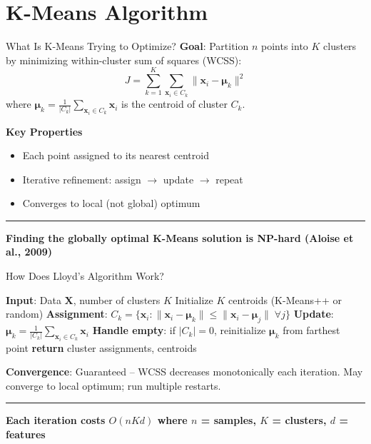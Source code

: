 \documentclass[8pt,aspectratio=169]{beamer}
\newcommand{\bottomnote}[1]{%
\vfill
\vspace{-2mm}
\textcolor{mllavender2}{\rule{\textwidth}{0.4pt}}
\vspace{1mm}
\footnotesize
\textbf{#1}
}
\begin{document}
\section{K-Means Algorithm}

\begin{frame}[t]{What Is K-Means Trying to Optimize?}
\textbf{Goal}: Partition $n$ points into $K$ clusters by minimizing within-cluster sum of squares (WCSS):
$$J = \sum_{k=1}^{K}\sum_{\mathbf{x}_i \in C_k}\|\mathbf{x}_i - \boldsymbol{\mu}_k\|^2$$
where $\boldsymbol{\mu}_k = \frac{1}{|C_k|}\sum_{\mathbf{x}_i \in C_k} \mathbf{x}_i$ is the centroid of cluster $C_k$.
\vspace{0.5em}

\textbf{Key Properties}
\begin{itemize}
\item Each point assigned to its nearest centroid
\item Iterative refinement: assign $\to$ update $\to$ repeat
\item Converges to local (not global) optimum
\end{itemize}
\bottomnote{Finding the globally optimal K-Means solution is NP-hard (Aloise et al., 2009)}
\end{frame}

\begin{frame}[t]{How Does Lloyd's Algorithm Work?}
\begin{algorithmic}[1]
\STATE \textbf{Input}: Data $\mathbf{X}$, number of clusters $K$
\STATE Initialize $K$ centroids (K-Means++ or random)
\REPEAT
\STATE \textbf{Assignment}: $C_k = \{\mathbf{x}_i : \|\mathbf{x}_i - \boldsymbol{\mu}_k\| \leq \|\mathbf{x}_i - \boldsymbol{\mu}_j\| \; \forall j\}$
\STATE \textbf{Update}: $\boldsymbol{\mu}_k = \frac{1}{|C_k|}\sum_{\mathbf{x}_i \in C_k} \mathbf{x}_i$
\STATE \textbf{Handle empty}: if $|C_k| = 0$, reinitialize $\boldsymbol{\mu}_k$ from farthest point
\STATE \textbf{return} cluster assignments, centroids
\end{algorithmic}
\vspace{0.5em}
\textbf{Convergence}: Guaranteed -- WCSS decreases monotonically each iteration. May converge to local optimum; run multiple restarts.
\bottomnote{Each iteration costs $O(nKd)$ where $n$ = samples, $K$ = clusters, $d$ = features}
\end{frame}
\end{document}
